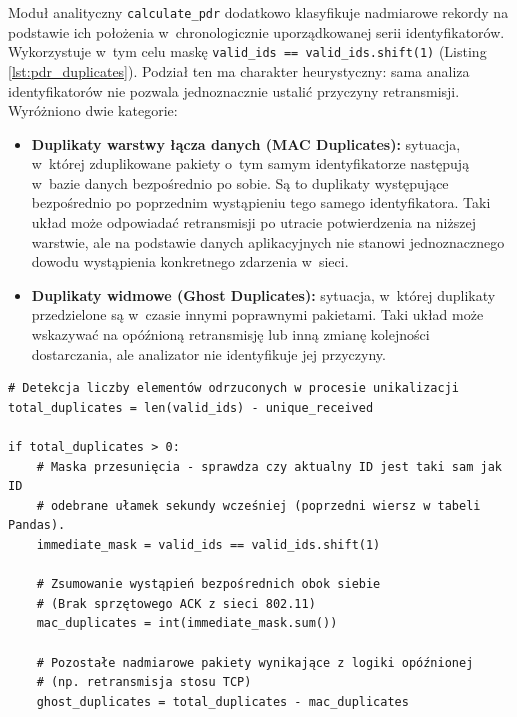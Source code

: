 Moduł analityczny \texttt{calculate\_pdr} dodatkowo klasyfikuje nadmiarowe rekordy na podstawie ich położenia w~chronologicznie uporządkowanej serii identyfikatorów.
Wykorzystuje w~tym celu maskę \texttt{valid\_ids == valid\_ids.shift(1)} (Listing \ref{lst:pdr_duplicates}).
Podział ten ma charakter heurystyczny: sama analiza identyfikatorów nie pozwala jednoznacznie ustalić przyczyny retransmisji.
Wyróżniono dwie kategorie:

\begin{itemize}
    \item \textbf{Duplikaty warstwy łącza danych (MAC Duplicates):}
          sytuacja, w~której zduplikowane pakiety o~tym samym identyfikatorze następują w~bazie danych bezpośrednio po sobie.
          Są to duplikaty występujące bezpośrednio po poprzednim wystąpieniu tego samego identyfikatora.
          Taki układ może odpowiadać retransmisji po utracie potwierdzenia na niższej warstwie, ale na podstawie danych aplikacyjnych nie stanowi jednoznacznego dowodu wystąpienia konkretnego zdarzenia w~sieci.
    \item \textbf{Duplikaty widmowe (Ghost Duplicates):}
          sytuacja, w~której duplikaty przedzielone są w~czasie innymi poprawnymi pakietami.
          Taki układ może wskazywać na opóźnioną retransmisję lub inną zmianę kolejności dostarczania, ale analizator nie identyfikuje jej przyczyny.
\end{itemize}

\begin{listing}[htbp]
    \caption{Wektorowa detekcja i~kategoryzacja zjawiska duplikacji pakietów radiowych za pomocą silnika Pandas (\texttt{pdr.py}) \cite{espy_nexus_python_host}.}
    \label{lst:pdr_duplicates}
    \begin{verbatim}
# Detekcja liczby elementów odrzuconych w procesie unikalizacji
total_duplicates = len(valid_ids) - unique_received

if total_duplicates > 0:
    # Maska przesunięcia - sprawdza czy aktualny ID jest taki sam jak ID 
    # odebrane ułamek sekundy wcześniej (poprzedni wiersz w tabeli Pandas).
    immediate_mask = valid_ids == valid_ids.shift(1)
    
    # Zsumowanie wystąpień bezpośrednich obok siebie 
    # (Brak sprzętowego ACK z sieci 802.11)
    mac_duplicates = int(immediate_mask.sum())
    
    # Pozostałe nadmiarowe pakiety wynikające z logiki opóźnionej 
    # (np. retransmisja stosu TCP)
    ghost_duplicates = total_duplicates - mac_duplicates
\end{verbatim}
\end{listing}

